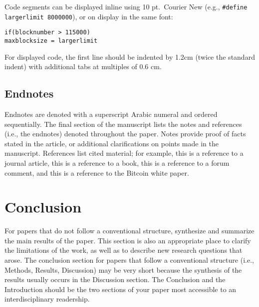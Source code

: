 \documentclass{ledger}
\begin{document}
Code segments can be displayed inline using 10 pt.~Courier New (e.g., \lstinline|#define largerlimit 8000000|), or on display in the same font:
\begin{lstlisting}
if(blocknumber > 115000)
maxblocksize = largerlimit
\end{lstlisting}
For displayed code, the first line should be indented by 1.2cm (twice the standard indent) with additional tabs at multiples of 0.6 cm.

\subsection{Endnotes}

Endnotes are denoted with a superscript Arabic numeral and ordered sequentially.  The final section of the manuscript lists the notes and references (i.e., the endnotes) denoted throughout the paper.  Notes provide proof of facts stated in the article, or additional clarifications on points made in the manuscript.  References list cited material; for example, this is a reference to a journal article, this is a reference to a book, this is a reference to a forum comment, and this is a reference to the Bitcoin white paper.

\section{Conclusion}

For papers that do not follow a conventional structure, synthesize and summarize the main results of the paper.  This section is also an appropriate place to clarify the limitations of the work, as well as to describe new research questions that arose.  The conclusion section for papers that follow a conventional structure (i.e., Methods, Results, Discussion) may be very short because the synthesis of the results usually occurs in the Discussion section.  The Conclusion and the Introduction should be the two sections of your paper most accessible to an interdisciplinary readership.
\end{document}
